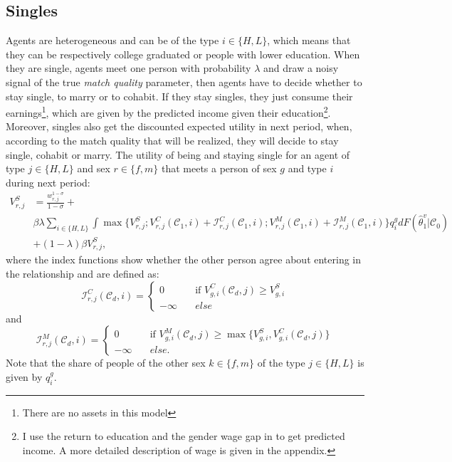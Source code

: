 \documentclass[12pt]{article}
\begin{document}
 \subsection{Singles}
 Agents are heterogeneous and can be of the type $i \in \{H,L\}$, which means that they can be respectively college graduated or people with lower education. When they are single, agents meet one person with probability $\lambda$ and draw a noisy signal of the true \textit{match quality} parameter, then agents have to decide whether to stay single, to marry or to cohabit. If they stay singles, they just consume their earnings\footnote{There are no assets in this model}, which are given by the predicted income given their education\footnote{I use the return to education and the gender wage gap in \citet{baudin2015} to get predicted income. A more detailed description of wage is given in the appendix.}. Moreover, singles also get the discounted expected utility in next period, when, according to the match quality that will be realized, they will decide to stay single, cohabit or marry.  The utility of being and staying single for an agent of type  $j \in \{H,L\}$ and sex $r\in \{f,m\}$ that meets a person of sex $g$ and type $i$ during next period:
\begin{equation}\label{eq:vsi}
\begin{split}
V_{r,j}^S&=\frac{w_{r,j}^{1-\sigma}}{1-\sigma}+\\&\beta\lambda\sum_{i\in \{H,L\}}\int\max\bigg\{V_{r,j}^S;V^{C}_{r,j}(\mathcal{C}_1,i)+\mathcal{I}_{r,j}^C(\mathcal{C}_1,i);V^{M}_{r,j}(\mathcal{C}_1,i)+\mathcal{I}_{r,j}^M(\mathcal{C}_1,i)\bigg\}q^{g}_i dF(\hat{\theta}_1^v|\mathcal{C}_0)\\&
+(1-\lambda)\beta V_{r,j}^S,
\end{split}
\end{equation}
where the index functions show whether the other person agree about entering  in the relationship and are defined as:
\begin{equation}
\mathcal{I}^C_{r,j}(\mathcal{C}_d,i)=
\begin{cases}
0       & \quad \text{if }V^{C}_{g,i}(\mathcal{C}_d,j) \geq V_{g,i}^{S}\\
-\infty  & \quad else
\end{cases}
\end{equation}
and
\begin{equation}
\mathcal{I}^M_{r,j}(\mathcal{C}_d,i)=
\begin{cases}
0       & \quad \text{if }V^{M}_{g,i}(\mathcal{C}_d,j) \geq\max\big\{V_{g,i}^{S},V^{C}_{g,i}(\mathcal{C}_d,j)\big\}\\
-\infty  & \quad else.
\end{cases}
\end{equation}
Note that the share of people of the other sex $k\in\{f,m\}$ of the type $j \in \{H,L\}$ is given by $q^g_i$.\\
\end{document}
